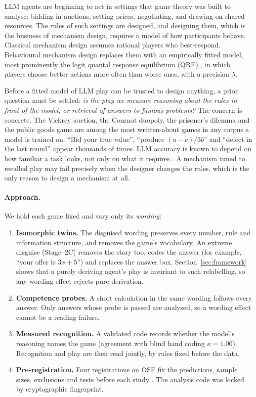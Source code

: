 \documentclass[11pt]{article}
\theoremstyle{definition}
\theoremstyle{remark}
\newcommand{\lam}{\lambda}
\begin{document}
LLM agents are beginning to act in settings that game theory was built to analyse: bidding in
auctions, setting prices, negotiating, and drawing on shared resources. The rules of such
settings are designed, and designing them, which is the business of mechanism design, requires a
model of how participants behave. Classical mechanism design assumes rational players who
best-respond. Behavioural mechanism design replaces them with an empirically fitted model, most
prominently the logit quantal response equilibrium (QRE) \citep{mckelvey1995qre,goeree2016qre},
in which players choose better actions more often than worse ones, with a precision $\lam$.

Before a fitted model of LLM play can be trusted to design anything, a prior question must be
settled: \emph{is the play we measure reasoning about the rules in front of the model, or
retrieval of answers to famous problems?} The concern is concrete. The Vickrey auction, the
Cournot duopoly, the prisoner's dilemma and the public goods game are among the most
written-about games in any corpus a model is trained on. ``Bid your true value'',
``produce $(a-c)/3b$'' and ``defect in the last round'' appear thousands of times. LLM accuracy is
known to depend on how familiar a task looks, not only on what it requires
\citep{mccoy2024embers}. A mechanism tuned to recalled play may fail precisely when the designer
changes the rules, which is the only reason to design a mechanism at all.

\paragraph{Approach.} We hold each game fixed and vary only its \emph{wording}:
\begin{enumerate}[label=(\roman*)]
\item \textbf{Isomorphic twins.} The disguised wording preserves every number, rule and
  information structure, and removes the game's vocabulary. An extreme disguise (Stage~2C)
  removes the story too, codes the answer (for example, ``your offer is $3x+5$'') and replaces
  the answer box. Section~\ref{sec:framework} shows that a purely deriving agent's play is
  invariant to such relabelling, so any wording effect rejects pure derivation.
\item \textbf{Competence probes.} A short calculation in the same wording follows every answer.
  Only answers whose probe is passed are analysed, so a wording effect cannot be a reading
  failure.
\item \textbf{Measured recognition.} A validated code records whether the model's reasoning
  names the game (agreement with blind hand coding $\kappa = 1.00$). Recognition and play are
  then read jointly, by rules fixed before the data.
\item \textbf{Pre-registration.} Four registrations on OSF fix the predictions, sample sizes,
  exclusions and tests before each study \citep{nosek2018prereg}. The analysis code was locked
  by cryptographic fingerprint.
\end{enumerate}
\end{document}
